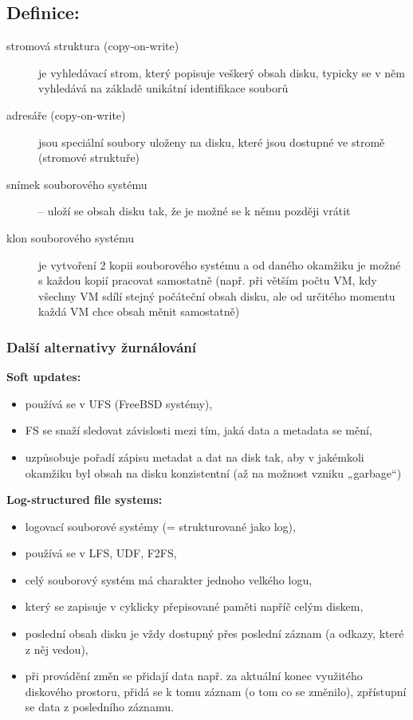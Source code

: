 \documentclass[a4paper, 11pt]{article}
\begin{document}
\subsection*{Definice:}
\begin{description}
\item[stromová struktura (copy-on-write)] je vyhledávací strom, který popisuje veškerý obsah disku, typicky se v něm vyhledává na základě unikátní identifikace souborů

\item[adresáře (copy-on-write)] jsou speciální soubory uloženy na disku, které jsou dostupné ve stromě (stromové struktuře)

\item[snímek souborového systému] -- uloží se obsah disku tak, že je možné se k němu později vrátit

\item[klon souborového systému] je vytvoření 2 kopii souborového systému a od daného okamžiku je možné s každou kopií pracovat samostatně (např. při větším počtu VM, kdy všechny VM sdílí stejný počáteční obsah disku, ale od určitého momentu každá VM chce obsah měnit samostatně)
\end{description}


\subsubsection{Další alternativy žurnálování}
\textbf{Soft updates:}
\begin{itemize}
 \item používá se v UFS (FreeBSD systémy),
 \item FS se snaží sledovat závislosti mezi tím, jaká data a metadata se mění,
 \item uzpůsobuje pořadí zápisu metadat a dat na disk tak, aby v jakémkoli okamžiku byl obsah na disku konzistentní (až na možnost vzniku „garbage“)
\end{itemize}

\textbf{Log-structured file systems:}
\begin{itemize}
 \item logovací souborové systémy (= strukturované jako log),
 \item používá se v LFS, UDF, F2FS,
 \item celý souborový systém má charakter jednoho velkého logu,
 \item který se zapisuje v cyklicky přepisované paměti napříč celým diskem,
 \item poslední obsah disku je vždy dostupný přes poslední záznam (a odkazy, které z něj vedou),
 \item při provádění změn se přidají data např. za aktuální konec využitého diskového prostoru, přidá se k tomu záznam (o tom co se změnilo), zpřístupní se data z posledního záznamu.
\end{itemize}
\end{document}
